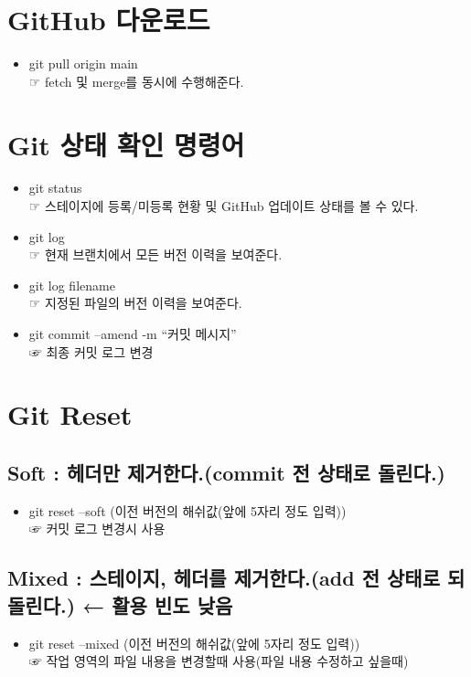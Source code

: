 \documentclass[12pt,a4paper]{oblivoir}
\begin{document}
\section[GitHub 다운로드]{GitHub 다운로드}
\begin{itemize}
\item git pull origin main \\  ☞ fetch 및 merge를 동시에 수행해준다.
\end{itemize}

\section[Git 상태 확인 명령어]{Git 상태 확인 명령어}
\begin{itemize}
\item git status \\  ☞ 스테이지에 등록/미등록 현황 및 GitHub 업데이트 상태를 볼 수 있다.
\item git log \\  ☞ 현재 브랜치에서 모든 버전 이력을 보여준다.
\item git log filename \\  ☞ 지정된 파일의 버전 이력을 보여준다.
\item git commit --amend -m ``커밋 메시지'' \\  ☞ 최종 커밋 로그 변경
\end{itemize}

\section[Git Reset]{Git Reset}
\subsection{Soft : 헤더만 제거한다.(commit 전 상태로 돌린다.)}  
\begin{itemize}
\item git reset --soft (이전 버전의 해쉬값(앞에 5자리 정도 입력)) \\  ☞ 커밋 로그 변경시 사용
\end{itemize}

\subsection{Mixed : 스테이지, 헤더를 제거한다.(add 전 상태로 되돌린다.)   ← 활용 빈도 낮음}
\begin{itemize}
\item git reset --mixed (이전 버전의 해쉬값(앞에 5자리 정도 입력)) \\  ☞ 작업 영역의 파일 내용을 변경할때 사용(파일 내용 수정하고 싶을때)
\end{itemize}
\end{document}
